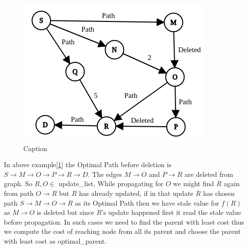 \documentclass[a4paper]{article}
\begin{document}
\begin{figure}[H]
    \centering
    \includegraphics[scale=0.4]{img/Delete1.png}
    \caption{Caption}
    \label{fig:delete_multiple}
\end{figure}

In above example[\ref{fig:delete_multiple}] the Optimal Path before deletion is $S \rightarrow M \rightarrow O \rightarrow P \rightarrow R \rightarrow D $.
The edges $ M \rightarrow O$ and $P \rightarrow R$ are deleted from graph. So $R,O \in $ update\_list, While propagating for $O$ we might find $R$ again from path $O \rightarrow R$ but $R$ has already updated, if in that update $R$ has chosen path $S \rightarrow M \rightarrow O \rightarrow R$ as its Optimal Path then we have stale value for $f(R)$ as $M \rightarrow O$ is deleted but since $R$'s update happened first it read the stale value before propagation. In such cases we need to find the parent with least cost thus we compute the cost of reaching node from all its parent and choose the parent with least cost as optimal\_parent.
\end{document}
